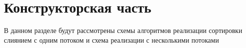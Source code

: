 \chapter{Конструкторская часть}
В данном разделе будут рассмотрены схемы алгоритмов реализации сортировки слиянием  с одним потоком 
и схема реализации с несколькими потоками


